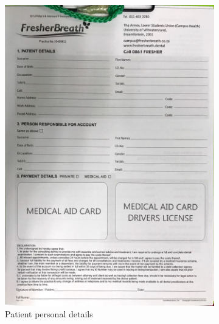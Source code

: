 \documentclass[11 pt]{article}
\begin{document}
\begin{figure}
\clearpage
\centering
\begin{subfigure}{.6\textwidth}
  \centering
  \includegraphics[width=.95\linewidth, left]{new_patient_paper_form.jpeg}
  \caption{Patient personal details}
  \label{fig:sub1}
\end{subfigure}%
\begin{subfigure}{.6\textwidth}
  \centering

\end{subfigure}
\end{figure}
\end{document}
